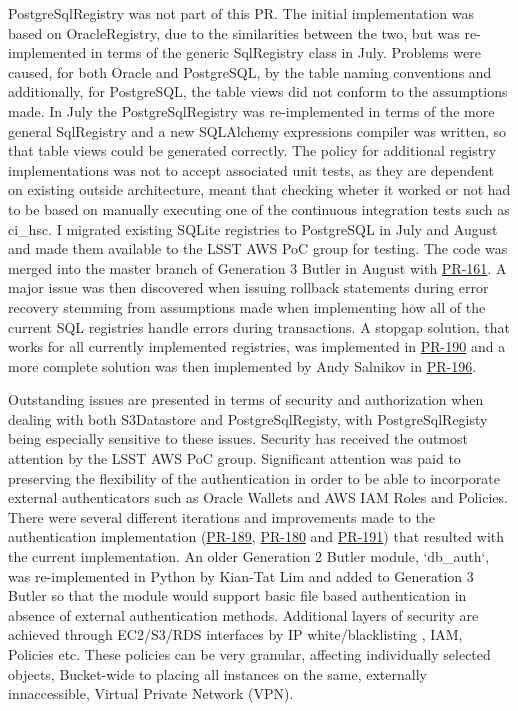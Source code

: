 PostgreSqlRegistry was not part of this PR. The initial implementation was based on OracleRegistry, due to the similarities between the two, but was re-implemented in terms of the generic SqlRegistry class in July. Problems were caused, for both Oracle and PostgreSQL, by the table naming conventions and additionally, for PostgreSQL, the table views did not conform to the assumptions made. In July the PostgreSqlRegistry was re-implemented in terms of the more general SqlRegistry and a new SQLAlchemy expressions compiler was written, so that table views could be generated correctly. The policy for additional registry implementations was not to accept associated unit tests, as they are dependent on existing outside architecture, meant that checking wheter it worked or not had to be based on manually executing one of the continuous integration tests such as ci\_hsc. I migrated existing SQLite registries to PostgreSQL in July and August and made them available to the LSST AWS PoC group for testing. The code was merged into the master branch of Generation 3 Butler in August with \href{https://github.com/lsst/daf_butler/pull/161}{PR-161}. A major issue was then discovered when issuing rollback statements during error recovery stemming from assumptions made when implementing how all of the current SQL registries handle errors during transactions. A stopgap solution, that works for all currently implemented registries, was implemented in \href{https://github.com/lsst/daf_butler/pull/190}{PR-190} and a more complete solution was then implemented by Andy Salnikov in \href{https://github.com/lsst/daf_butler/pull/196}{PR-196}.


Outstanding issues are presented in terms of security and authorization when dealing with both S3Datastore and PostgreSqlRegisty, with PostgreSqlRegisty being especially sensitive to these issues. Security has received the outmost attention by the LSST AWS PoC group. Significant attention was paid to preserving the flexibility of the authentication in order to be able to incorporate external authenticators such as Oracle Wallets and AWS IAM Roles and Policies. There were several different iterations and improvements made to the authentication implementation (\href{https://github.com/lsst/daf_butler/pull/189}{PR-189}, \href{https://github.com/lsst/daf_butler/pull/180}{PR-180} and \href{https://github.com/lsst/daf_butler/pull/191}{PR-191}) that resulted with the current implementation. An older Generation 2 Butler module, `db\_auth`, was re-implemented in Python by Kian-Tat Lim and added to Generation 3 Butler so that the module would support basic file based authentication in absence of external authentication methods. Additional layers of security are achieved through EC2/S3/RDS interfaces by IP white/blacklisting , IAM, Policies etc. These policies can be very granular, affecting individually selected objects, Bucket-wide to placing all instances on the same, externally innaccessible, Virtual Private Network (VPN).

